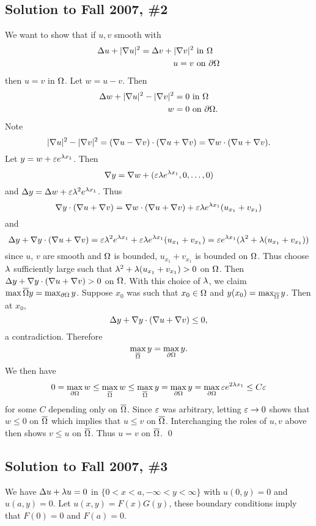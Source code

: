 \subsection*{Solution to Fall 2007, \#2}\label{f072}
We want to show that if $u, v$ smooth with
\begin{align*}
\Delta u + |\nabla u|^{2} = \Delta v + |\nabla v|^{2} & \text{ in } \Omega\\
u = v & \text{ on } \partial \Omega
\end{align*}
then $u = v$ in $\Omega$. Let $w = u - v$. Then
\begin{align*}
\Delta w + |\nabla u|^{2} - |\nabla v|^{2} = 0 & \text{ in } \Omega\\
w = 0 & \text{ on } \partial \Omega.
\end{align*}
Note
$$|\nabla u|^{2} - |\nabla v|^{2} = (\nabla u - \nabla v) \cdot (\nabla u + \nabla v) = \nabla w \cdot (\nabla u + \nabla v).$$
Let $y = w + \varepsilon e^{\lambda x_{1}}$. Then
$$\nabla y = \nabla w + (\varepsilon\lambda e^{\lambda x_{1}}, 0, \ldots, 0)$$
and $\Delta y = \Delta w + \varepsilon\lambda^{2}e^{\lambda x_{1}}$.
Thus
$$\nabla y \cdot (\nabla u + \nabla v) = \nabla w \cdot (\nabla u + \nabla v) + \varepsilon \lambda e^{\lambda x_{1}}(u_{x_{1}} + v_{x_{1}})$$
and
$$\Delta y + \nabla y \cdot (\nabla u + \nabla v) = \varepsilon\lambda^{2}e^{\lambda x_{1}} + \varepsilon \lambda e^{\lambda x_{1}}(u_{x_{1}} + v_{x_{1}}) = \varepsilon e^{\lambda x_{1}}(\lambda^{2} + \lambda(u_{x_{1}} + v_{x_{1}}))$$
since $u$, $v$ are smooth and $\Omega$ is bounded, $u_{x_{1}} + v_{x_{1}}$ is bounded on $\Omega$. Thus choose
$\lambda$ sufficiently large such that $\lambda^{2} + \lambda(u_{x_1} + v_{x_1}) > 0$ on $\Omega$.
Then $\Delta y + \nabla y \cdot (\nabla u + \nabla v) > 0$ on $\Omega$.
With this choice of $\lambda$, we claim
$\max{\overline{\Omega}}y = \max_{\partial\Omega}y$. Suppose $x_{0}$ was such that $x_0 \in \Omega$ and $y(x_{0}) = \max_{\overline{\Omega}}y$.
Then at $x_{0}$,
$$\Delta y + \nabla y \cdot (\nabla u + \nabla v) \leq 0,$$
a contradiction. Therefore $$\max_{\overline{\Omega}}y = \max_{\partial\Omega}y.$$
We then have
$$0 = \max_{\partial\Omega}w \leq \max_{\overline{\Omega}}w \leq \max_{\overline{\Omega}}y = \max_{\partial\Omega}y = \max_{\partial\Omega}\varepsilon e^{2\lambda x_{1}} \leq C\varepsilon$$
for some $C$ depending only on $\overline{\Omega}$. Since $\varepsilon$ was arbitrary, letting $\varepsilon \rightarrow 0$ shows that
$w \leq 0$ on $\overline{\Omega}$ which implies that $u \leq v$ on $\overline{\Omega}$.
Interchanging the roles of $u, v$ above then shows $v \leq u$ on $\overline{\Omega}$.
Thus $u = v$ on $\overline{\Omega}$.
\hfill\qed

\subsection*{Solution to Fall 2007, \#3}\label{f073}
We have $\Delta u + \lambda u = 0$ in $\{0 < x < a, -\infty < y < \infty\}$ with $u(0, y) = 0$ and $u(a, y) = 0$.
Let $u(x, y) = F(x)G(y)$, these boundary conditions imply that $F(0) = 0$ and $F(a) = 0$.

